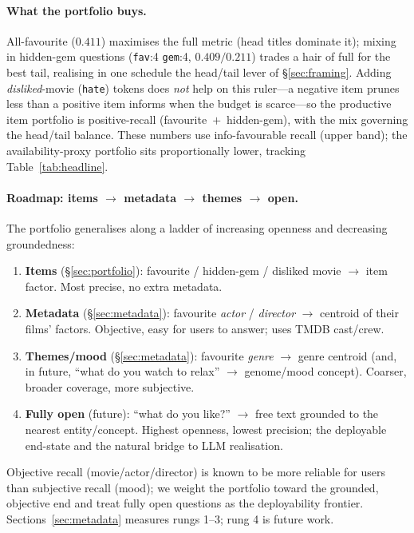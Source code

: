 \documentclass[11pt]{article}
\begin{document}
\paragraph{What the portfolio buys.} All-favourite ($0.411$) maximises the full metric (head titles dominate it);
mixing in hidden-gem questions (\texttt{fav}:4 \texttt{gem}:4, $0.409/0.211$) trades a hair of full for the best tail,
realising in one schedule the head/tail lever of \S\ref{sec:framing}. Adding \emph{disliked}-movie (\texttt{hate})
tokens does \emph{not} help on this ruler---a negative item prunes less than a positive item informs when the budget is
scarce---so the productive item portfolio is positive-recall (favourite~$+$~hidden-gem), with the mix governing the
head/tail balance. These numbers use info-favourable recall (upper band); the availability-proxy portfolio sits
proportionally lower, tracking Table~\ref{tab:headline}.

\paragraph{Roadmap: items $\to$ metadata $\to$ themes $\to$ open.} The portfolio generalises along a ladder of
increasing openness and decreasing groundedness:
\begin{enumerate}
  \item \textbf{Items} (\S\ref{sec:portfolio}): favourite / hidden-gem / disliked movie $\to$ item factor. Most precise,
  no extra metadata.
  \item \textbf{Metadata} (\S\ref{sec:metadata}): favourite \emph{actor} / \emph{director} $\to$ centroid of their
  films' factors. Objective, easy for users to answer; uses TMDB cast/crew.
  \item \textbf{Themes/mood} (\S\ref{sec:metadata}): favourite \emph{genre} $\to$ genre centroid (and, in future,
  ``what do you watch to relax'' $\to$ genome/mood concept). Coarser, broader coverage, more subjective.
  \item \textbf{Fully open} (future): ``what do you like?'' $\to$ free text grounded to the nearest entity/concept.
  Highest openness, lowest precision; the deployable end-state and the natural bridge to LLM realisation.
\end{enumerate}
Objective recall (movie/actor/director) is known to be more reliable for users than subjective recall (mood); we weight
the portfolio toward the grounded, objective end and treat fully open questions as the deployability frontier.
Sections~\ref{sec:metadata} measures rungs 1--3; rung 4 is future work.
\end{document}

